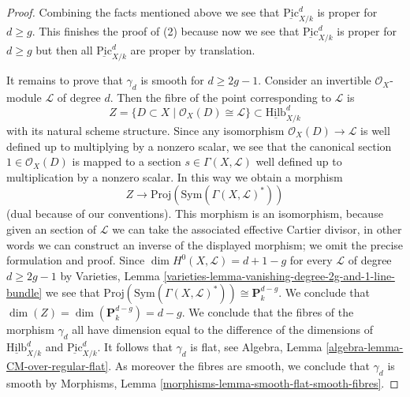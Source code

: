 \documentclass[10pt,a4paper]{amsart}
\theoremstyle{plain}
\theoremstyle{definition}
\theoremstyle{remark}
\numberwithin{equation}{subsection}
\def\Hilbfunctor{\mathrm{Hilb}}
\def\Picardfunctor{\mathrm{Pic}}
\begin{document}
\begin{proof}
\medskip\noindent
Combining the facts mentioned above we see that
$\underline{\Picardfunctor}^d_{X/k}$ is proper for $d \geq g$.
This finishes the proof of (2) because now we see that
$\underline{\Picardfunctor}^d_{X/k}$ is proper for $d \geq g$ but
then all $\underline{\Picardfunctor}^d_{X/k}$ are proper by translation.

\medskip\noindent
It remains to prove that $\gamma_d$ is smooth for $d \geq 2g - 1$.
Consider an invertible $\mathcal{O}_X$-module $\mathcal{L}$ of degree
$d$. Then the fibre of the point corresponding to $\mathcal{L}$ is
$$
Z = \{D \subset X \mid \mathcal{O}_X(D) \cong \mathcal{L}\} \subset
\underline{\Hilbfunctor}^d_{X/k}
$$
with its natural scheme structure. Since any isomorphism
$\mathcal{O}_X(D) \to \mathcal{L}$ is well defined up
to multiplying by a nonzero scalar, we see that the canonical
section $1 \in \mathcal{O}_X(D)$ is mapped to a section
$s \in \Gamma(X, \mathcal{L})$ well defined up to multiplication
by a nonzero scalar. In this way we obtain a morphism
$$
Z \longrightarrow
\text{Proj}(\text{Sym}(\Gamma(X, \mathcal{L})^*))
$$
(dual because of our conventions). This morphism is an isomorphism,
because given an section of $\mathcal{L}$ we can take the associated
effective Cartier divisor, in other words we can construct an inverse of
the displayed morphism; we omit the precise formulation and proof.
Since $\dim H^0(X, \mathcal{L}) = d + 1 - g$ for every
$\mathcal{L}$ of degree $d \geq 2g - 1$ by
Varieties, Lemma \ref{varieties-lemma-vanishing-degree-2g-and-1-line-bundle}
we see that $\text{Proj}(\text{Sym}(\Gamma(X, \mathcal{L})^*))
\cong \mathbf{P}^{d - g}_k$.
We conclude that $\dim(Z) = \dim(\mathbf{P}^{d - g}_k) = d - g$.
We conclude that the fibres of the morphism $\gamma_d$ all
have dimension equal to the difference of the dimensions of
$\underline{\Hilbfunctor}^d_{X/k}$ and $\underline{\Picardfunctor}^d_{X/k}$.
It follows that $\gamma_d$ is flat, see
Algebra, Lemma \ref{algebra-lemma-CM-over-regular-flat}.
As moreover the fibres are smooth, we conclude that $\gamma_d$
is smooth by Morphisms, Lemma \ref{morphisms-lemma-smooth-flat-smooth-fibres}.
\end{proof}
\end{document}
